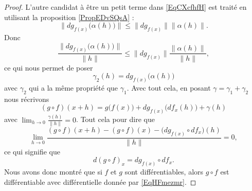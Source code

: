 \begin{proof}
    L'autre candidat à être un petit terme dans \eqref{EqCXcfhfH} est traité en utilisant la proposition \ref{PropEDvSQsA} :
    \begin{equation}
        \| dg_{f(x)}\big( \alpha(h) \big) \|\leq \| dg_{f(x)} \|\| \alpha(h) \|.
    \end{equation}
    Donc
    \begin{equation}
        \frac{ \| dg_{f(x)}\big( \alpha(h) \big) \| }{ \| h \| }\leq \| dg_{f(x)} \|\frac{ \| \alpha(h) \| }{ \| h \| },
    \end{equation}
    ce qui nous permet de poser
    \begin{equation}
        \gamma_2(h)=dg_{f(x)}\big( \alpha(h) \big)
    \end{equation}
    avec \( \gamma_2\) qui a la même propriété que \( \gamma_1\). Avec tout cela, en posant \( \gamma=\gamma_1+\gamma_2\) nous récrivons
    \begin{equation}
        (g\circ f)(x+h)=g\big( f(x) \big)+dg_{f(x)}\big( df_x(h) \big)+\gamma(h)
    \end{equation}
    avec \( \lim_{h\to 0} \frac{ \gamma(h) }{ \| h \| }=0\). Tout cela pour dire que
    \begin{equation}
        \lim_{h\to 0} \frac{ (g\circ f)(x+h)-(g\circ f)(x)-\big( dg_{f(x)}\circ df_x \big)(h) }{ \| h \| }=0,
    \end{equation}
    ce qui signifie que 
    \begin{equation}
        d(g\circ f)_x=dg_{f(x)}\circ df_x.
    \end{equation}
    Nous avons donc montré que si \( f\) et \( g\) sont différentiables, alors \( g\circ f\) est différentiable avec différentielle donnée par \eqref{EqHFmezmr}.


\end{proof}

